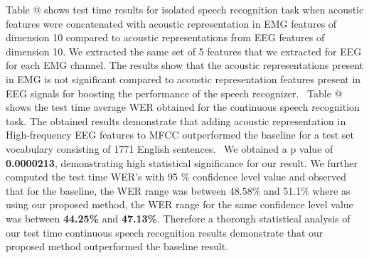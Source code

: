 \documentclass[letterpaper, 10 pt, conference]{ieeeconf}  %
\makeatletter
\newcommand*{\rom}[1]{\expandafter\@slowromancap\romannumeral #1@}
\makeatother
\begin{document}
Table \rom{7} shows test time results for isolated speech recognition task when acoustic features were concatenated with acoustic representation in EMG features of dimension 10 compared to acoustic representations from EEG features of dimension 10. We extracted the same set of 5 features that we extracted for EEG for each EMG channel. The results show that the acoustic representations present in EMG is not significant compared to acoustic representation features present in EEG signals for boosting the performance of the speech recognizer. 
Table \rom{8} shows the test time average WER obtained for the continuous speech recognition task. The obtained results demonstrate that adding acoustic representation in High-frequency EEG features to MFCC outperformed the baseline for a test set vocabulary consisting of 1771 English sentences.  We obtained a p value \cite{griffiths2019statistical} of \textbf{0.0000213}, demonstrating high statistical significance for our result.  We further computed the test time WER's with 95 \% confidence level value and observed that for the baseline, the WER range was between 48.58\% and 51.1\% where as  using our proposed method, the WER range for the same confidence level value was between \textbf{44.25\%} and \textbf{47.13\%}. Therefore a thorough statistical analysis of our test time continuous speech recognition results demonstrate that our proposed method outperformed the baseline result. 
\end{document}
